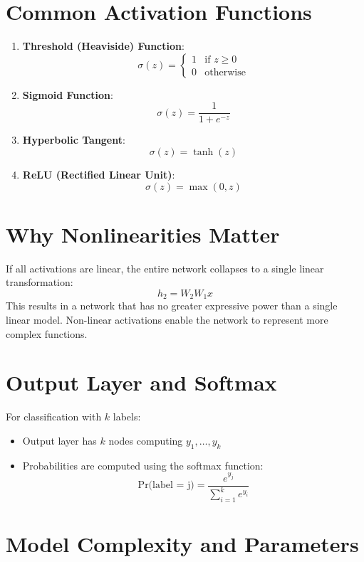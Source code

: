 \documentclass[11pt]{article}
\begin{document}
\section{Common Activation Functions}

\begin{enumerate}[label=(\alph*)]
    \item \textbf{Threshold (Heaviside) Function}:
    \[
    \sigma(z) = 
    \begin{cases}
    1 & \text{if } z \geq 0 \\
    0 & \text{otherwise}
    \end{cases}
    \]

    \item \textbf{Sigmoid Function}:
    \[
    \sigma(z) = \frac{1}{1 + e^{-z}}
    \]

    \item \textbf{Hyperbolic Tangent}:
    \[
    \sigma(z) = \tanh(z)
    \]

    \item \textbf{ReLU (Rectified Linear Unit)}:
    \[
    \sigma(z) = \max(0, z)
    \]
\end{enumerate}

\section{Why Nonlinearities Matter}

If all activations are linear, the entire network collapses to a single linear transformation:
\[
h_2 = W_2 W_1 x
\]
This results in a network that has no greater expressive power than a single linear model. Non-linear activations enable the network to represent more complex functions.

\section{Output Layer and Softmax}

For classification with $k$ labels:
\begin{itemize}
    \item Output layer has $k$ nodes computing $y_1, \ldots, y_k$
    \item Probabilities are computed using the softmax function:
    \[
    \text{Pr(label = j)} = \frac{e^{y_j}}{\sum_{i=1}^k e^{y_i}}
    \]
\end{itemize}

\section{Model Complexity and Parameters}
\end{document}
